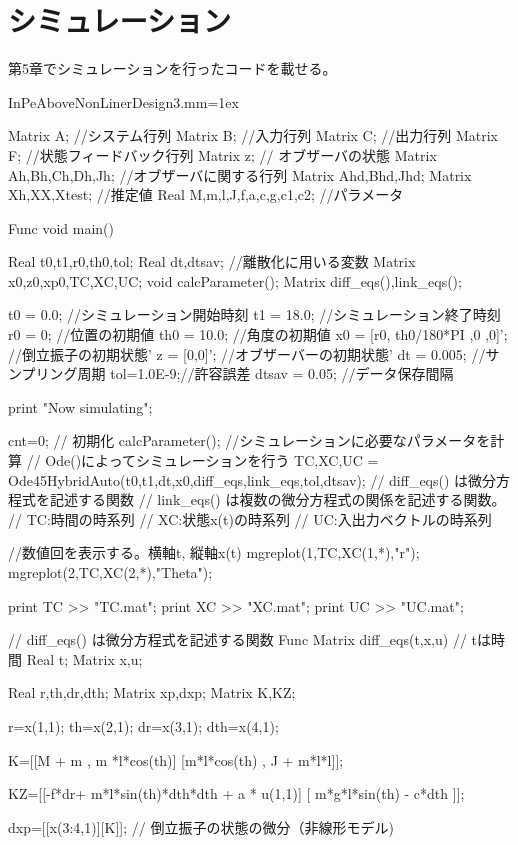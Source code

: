 \section{シミュレーション}
	第5章でシミュレーションを行ったコードを載せる。
	\begin{itembox}[l]{InPeAboveNonLinerDesign3.mm}\baselineskip=1ex
		\begin{verbatimtab}[4]
Matrix A; //システム行列
Matrix B; //入力行列
Matrix C; //出力行列
Matrix F; //状態フィードバック行列
Matrix z; // オブザーバの状態
Matrix Ah,Bh,Ch,Dh,Jh; //オブザーバに関する行列
Matrix Ahd,Bhd,Jhd;
Matrix Xh,XX,Xtest; //推定値
Real M,m,l,J,f,a,c,g,c1,c2; //パラメータ

Func void main()
{
	Real t0,t1,r0,th0,tol;
	Real dt,dtsav; //離散化に用いる変数
	Matrix x0,z0,xp0,TC,XC,UC;
	void calcParameter();
	Matrix diff_eqs(),link_eqs();
	
	t0 = 0.0; //シミュレーション開始時刻
	t1 = 18.0; //シミュレーション終了時刻
	r0 = 0; //位置の初期値
	th0 = 10.0; //角度の初期値
	x0 = [r0, th0/180*PI ,0 ,0]'; //倒立振子の初期状態'
	z = [0,0]'; //オブザーバーの初期状態'
	dt = 0.005; //サンプリング周期
	tol=1.0E-9;//許容誤差
	dtsav = 0.05; //データ保存間隔
	
	print "Now simulating\n";
	
	cnt=0; // 初期化
    calcParameter(); //シミュレーションに必要なパラメータを計算
	// Ode()によってシミュレーションを行う
	{TC,XC,UC} =
	 Ode45HybridAuto(t0,t1,dt,x0,diff_eqs,link_eqs,tol,dtsav);
	// diff_eqs() は微分方程式を記述する関数
	// link_eqs() は複数の微分方程式の関係を記述する関数。
	// TC:時間の時系列
	// XC:状態x(t)の時系列
	// UC:入出力ベクトルの時系列
	
	//数値回を表示する。横軸t, 縦軸x(t)
	mgreplot(1,TC,XC(1,*),{"r"});
	mgreplot(2,TC,XC(2,*),{"Theta"});
	
	print TC >> "TC.mat";
	print XC >> "XC.mat";
	print UC >> "UC.mat";
}



// diff_eqs() は微分方程式を記述する関数
Func Matrix diff_eqs(t,x,u)
// tは時間
Real t;
Matrix x,u;
{
	Real r,th,dr,dth;
	Matrix xp,dxp;
	Matrix K,KZ;
	
	r=x(1,1);
	th=x(2,1);
	dr=x(3,1);
	dth=x(4,1);

	K=[[M + m , m *l*cos(th)]
	   [m*l*cos(th) , J + m*l*l]];

	KZ=[[-f*dr+ m*l*sin(th)*dth*dth + a * u(1,1)]
		[ m*g*l*sin(th) - c*dth ]];
	
	dxp=[[x(3:4,1)][K\KZ]]; // 倒立振子の状態の微分（非線形モデル)
	
}
\end{verbatimtab}
\end{itembox}

